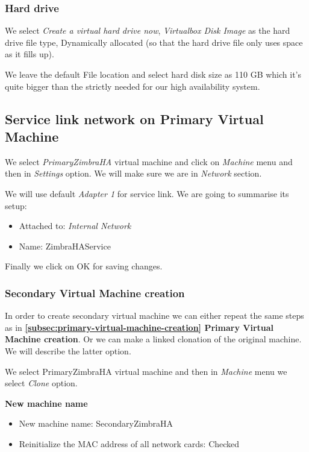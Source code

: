 \subsubsection {Hard drive}
We select \textit{Create a virtual hard drive now}, \textit{Virtualbox Disk Image} as the hard drive file type, Dynamically allocated (so that the hard drive file only uses space as it fills up).

We leave the default File location and select hard disk size as 110 GB which it's quite bigger than the strictly needed for our high availability system.

\subsection {\label{subsec:service-link-primary}Service link network on Primary Virtual Machine}
We select \textit{PrimaryZimbraHA} virtual machine and click on \textit{Machine} menu and then in \textit{Settings} option. We will make sure we are in \textit{Network} section.

We will use default \textit{Adapter 1} for service link. We are going to summarise its setup:
\begin{itemize}
  \item Attached to: \textit{Internal Network}
  \item Name: ZimbraHAService
\end{itemize}

Finally we click on OK for saving changes.

\subsubsection {Secondary Virtual Machine creation}
In order to create secondary virtual machine we can either repeat the same steps as in \textbf{\ref{subsec:primary-virtual-machine-creation} Primary Virtual Machine creation}. Or we can make a linked clonation of the original machine. We will describe the latter option.

We select PrimaryZimbraHA virtual machine and then in \textit{Machine} menu we select \textit{Clone} option.

\textbf{New machine name}
\begin{itemize}
  \item New machine name: SecondaryZimbraHA
  \item Reinitialize the MAC address of all network cards: Checked
\end{itemize}

